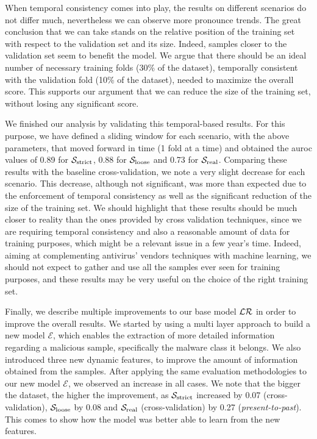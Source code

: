 When temporal consistency comes into play, the results on different scenarios do not differ much, nevertheless we can observe more pronounce trends.
The great conclusion that we can take stands on the relative position of the training set with respect to the validation set and its size.
Indeed, samples closer to the validation set seem to benefit the model.
We argue that there should be an ideal number of necessary training folds (30\% of the dataset), temporally consistent with the validation fold (10\% of the dataset), needed to maximize the overall score.
This supports our argument that we can reduce the size of the training set, without losing any significant score.

We finished our analysis by validating this temporal-based results.
For this purpose, we have defined a sliding window for each scenario, with the above parameters, that moved forward in time (1 fold at a time) and obtained the \gls{auroc} values of 0.89 for $\mathcal{S}_{\mathrm{strict}}$, 0.88 for $\mathcal{S}_{\mathrm{loose}}$ and 0.73 for $\mathcal{S}_{\mathrm{real}}$.
Comparing these results with the baseline cross-validation, we note a very slight decrease for each scenario.
This decrease, although not significant, was more than expected due to the enforcement of temporal consistency as well as the significant reduction of the size of the training set. 
We should highlight that these results should be much closer to reality than the ones provided by cross validation techniques, since we are requiring temporal consistency and also a reasonable amount of data for training purposes, which might be a relevant issue in a few year's time.
Indeed, aiming at complementing antivirus' vendors techniques with machine learning, we should not expect to gather and use all the samples ever seen for training purposes, and these results may be very useful on the choice of the right training set.

Finally, we describe multiple improvements to our base model $\mathcal{LR}$ in order to improve the overall results.
We started by using a multi layer approach to build a new model $\mathcal{E}$, which enables the extraction of more detailed information regarding a malicious sample, specifically the malware class it belongs.
We also introduced three new dynamic features, to improve the amount of information obtained from the samples.
After applying the same evaluation methodologies to our new model $\mathcal{E}$, we observed an increase in all cases.
We note that the bigger the dataset, the higher the improvement, as $\mathcal{S}_{\mathrm{strict}}$ increased by 0.07 (cross-validation), $\mathcal{S}_{\mathrm{loose}}$ by 0.08 and $\mathcal{S}_{\mathrm{real}}$ (cross-validation) by 0.27 (\textit{present-to-past}).
This comes to show how the model was better able to learn from the new features.
